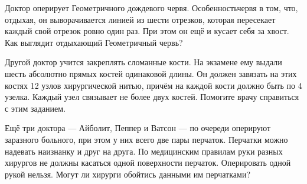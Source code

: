 ﻿
\begin{itemize}

\itA Доктор оперирует Геометричного дождевого червя. Особенность\linebreak червя в том, что, отдыхая, он выворачивается линией из шести отрезков, которая пересекает каждый свой отрезок ровно один раз. При этом он ещё и кусает себя за хвост. Как выглядит отдыхающий Геометричный червь?

\itB Другой доктор учится закреплять сломанные кости. На экзамене ему выдали шесть абсолютно прямых костей одинаковой длины. Он должен завязать на этих костях 12 узлов хирургической нитью, причём на каждой кости должно быть по 4 узелка. Каждый узел связывает не более двух костей. Помогите врачу справиться с этим заданием.

\itC Ещё три доктора — Айболит, Пеппер и Ватсон — по очереди оперируют заразного больного, при этом у них всего две пары перчаток. Перчатки можно надевать наизнанку и друг на друга. По медицинским правилам руки разных хирургов не должны касаться одной поверхности перчаток. Оперировать одной рукой нельзя. Могут ли хирурги обойтись данными им перчатками?
\end{itemize}